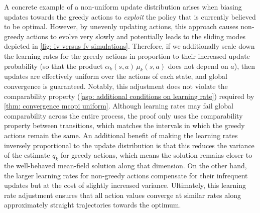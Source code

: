 



A concrete example of a non-uniform update distribution arises when biasing updates towards the greedy actions to \textit{exploit} the policy that is currently believed to be optimal.
However, by unevenly updating actions, this approach causes non-greedy actions to evolve very slowly and potentially leads to the sliding modes depicted in \autoref{fig: iv versus fv simulations}.
Therefore, if we additionally scale down the learning rates for the greedy actions in proportion to their increased update probability (so that the product $\alpha_k(s,a)\,\mu_k(s,a)$ does not depend on $a$),
then updates are effectively uniform over the actions of each state, and global convergence is guaranteed.
Notably, this adjustment does not violate the comparability property (\autoref{asp: additional conditions on learning rate}) required by \autoref{thm: convergence mcopi uniform}. Although learning rates may fail global comparability across the entire process, the proof only uses the comparability property between transitions, which matches the intervals in which the greedy actions remain the same.
An additional benefit of making the learning rates inversely proportional to the update distribution is that this reduces the variance of the estimate $q_k$ for greedy actions, which means the solution remains closer to the well-behaved mean-field solution along that dimension.
On the other hand, the larger learning rates for non-greedy actions compensate for their infrequent updates but at the cost of slightly increased variance.
Ultimately, this learning rate adjustment 
ensures that all action values converge at similar rates along approximately straight trajectories towards the optimum.



